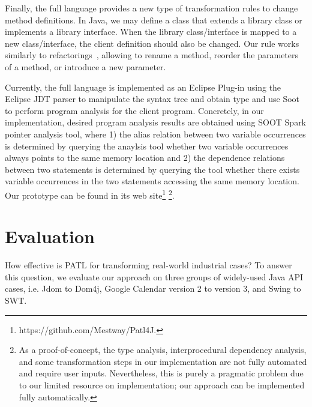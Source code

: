\documentclass[a4paper, USenglish]{lipics-v2016}
\theoremstyle{plain}
\begin{document}
Finally, the full language provides a new type of transformation rules
to change method definitions. In Java, we may define a class that
extends a library class or implements a library interface. When the
library class/interface is mapped to a new class/interface, the client
definition should also be changed. Our rule works similarly to
refactorings~\cite{Henkel:2005:CCR:1062455.1062512}, allowing to
rename a method, reorder the parameters of a method, or introduce a
new parameter.

Currently, the full language is implemented as an Eclipse Plug-in
using the Eclipse JDT parser to manipulate the syntax tree and obtain
type and use Soot~\cite{Vallee-Rai:1999:SJB:781995.782008} to perform
program analysis for the client program. Concretely, in our implementation, desired program analysis results are obtained using SOOT Spark pointer analysis tool, where 1) the alias relation between two variable occurrences is determined by querying the anaylsis tool whether two variable occurrences always points to the same memory location and 2) the dependence relations between two statements is determined by querying the tool whether there exists variable occurrences in the two statements accessing the same memory location. Our prototype can be
found in its web site\footnote{https://github.com/Mestway/Patl4J.}
\footnote{As a proof-of-concept, the type analysis, interprocedural dependency
    analysis, and some transformation steps
   in our implementation are not fully automated and require
  user inputs. Nevertheless, this is purely a
  pragmatic problem due to our limited resource on implementation;
our approach can be implemented fully automatically.}. 

\section{Evaluation}
\label{sec:evaluation}

How effective is PATL for transforming real-world industrial cases? To
answer this question, we evaluate our approach
on three groups of widely-used Java API cases, i.e. Jdom to Dom4j,
Google Calendar version 2 to version 3, and Swing to SWT.
\end{document}
